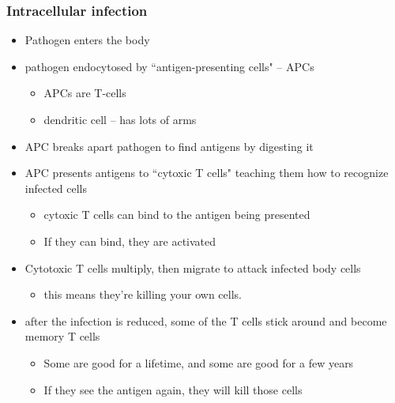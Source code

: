 \documentclass{article}
\theoremstyle{definition}
\begin{document}
\subsubsection{Intracellular infection}
\begin{itemize}
	\item Pathogen enters the body
	\item pathogen endocytosed by ``antigen-presenting cells" -- APCs
		\begin{itemize}
			\item APCs are T-cells
			\item dendritic cell -- has lots of arms
		\end{itemize}
	\item APC breaks apart pathogen to find antigens by digesting it
	\item APC presents antigens to ``cytoxic T cells" teaching them how to recognize infected cells
		\begin{itemize}
			\item cytoxic T cells can bind to the antigen being presented
			\item If they can bind, they are activated
		\end{itemize}
	\item Cytotoxic T cells multiply, then migrate to attack infected body cells
		\begin{itemize}
			\item this means they're killing your own cells.
		\end{itemize}
	\item after the infection is reduced, some of the T cells stick around and become memory T cells
		\begin{itemize}
			\item Some are good for a lifetime, and some are good for a few years
			\item If they see the antigen again, they will kill those cells
		\end{itemize}
\end{itemize}
\end{document}
